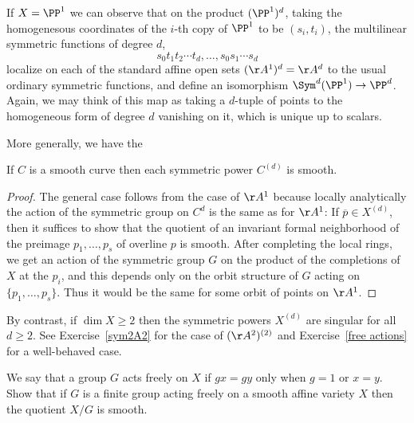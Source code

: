 If $X = \PP^1$ we can observe that on the product $(\PP^1)^d$, taking the homogenesous coordinates of the
$i$-th copy of $\PP^1$ to be $(s_i,t_i)$, the multilinear symmetric functions of degree $d$,
$$
s_0t_1t_2\cdots t_d,\dots,s_0s_1\cdots s_d
$$
localize on each of the standard affine open sets $(\AA^1)^d=\AA^d$ to the usual ordinary symmetric functions, and define
an isomorphism $\Sym^d(\PP^1)\to \PP^d$.
Again, we may think of this map as taking a $d$-tuple of points to the
homogeneous form of degree $d$ vanishing on it, which is unique up to scalars.

More generally, we have the

\begin{proposition}
If $C$ is a smooth curve then each symmetric power $C^{(d)}$ is smooth.
\end{proposition}

\begin{proof}
 The general case follows from the case of $\AA^{1}$ because locally analytically the action of the symmetric group on $C^d$ is the same as for $\AA^1$: If  $\overline p \in X^{(d)}$, then it suffices to
 show that the quotient of an invariant formal neighborhood of the preimage $p_1,\dots, p_s$ of
 overline $p$ is smooth. After completing the local rings, we get an action of the symmetric group
 $G$ on the product of the completions of $X$ at the $p_i$, and this depends only on the orbit
 structure of $G$ acting on $\{p_1,\dots, p_s\}$. Thus it would be the same for some orbit of
 points on $\AA^1$.
 \end{proof}

By contrast, if $\dim X \geq 2$ then the symmetric powers $X^{(d)}$ are singular for all $d \geq 2$.
See Exercise~\ref{sym2A2} for the case of $(\AA^2)^{(2)}$ and Exercise~\ref{free actions} for a well-behaved case.

\begin{exercise}\label{free actions}
We say that a group $G$ acts freely on $X$ if $gx = gy$ only when $g =1$ or $x=y$. Show that
 if $G$ is a finite group acting freely on a smooth affine variety $X$ then the quotient $X/G$ is smooth.
\end{exercise}

